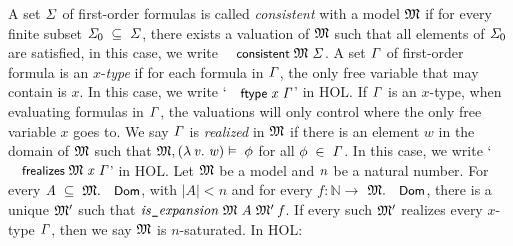 \documentclass{llncs}
\renewcommand{\HOLConst}[1]{{\textsf{\upshape\small #1}}}
\renewcommand{\HOLinline}[1]{\ensuremath{#1}}
\renewcommand{\HOLFieldName}[1]{\HOLConst{#1}}
\begin{document}
A set \HOLinline{\HOLFreeVar{\ensuremath{\Sigma}}} of first-order formulas is called \emph{consistent} with a model \HOLinline{\HOLFreeVar{\ensuremath{\mathfrak{M}}}} if for every finite subset \HOLinline{\HOLFreeVar{\ensuremath{\Sigma}}\sb{\mathrm{0}}\;\HOLSymConst{\HOLTokenSubset{}}\;\HOLFreeVar{\ensuremath{\Sigma}}}, there exists a valuation of \HOLinline{\HOLFreeVar{\ensuremath{\mathfrak{M}}}} such that all elements of \HOLinline{\HOLFreeVar{\ensuremath{\Sigma}}\sb{\mathrm{0}}} are satisfied, in this case, we write \HOLinline{\HOLConst{consistent}\;\HOLFreeVar{\ensuremath{\mathfrak{M}}}\;\HOLFreeVar{\ensuremath{\Sigma}}}. A set \HOLinline{\HOLFreeVar{\ensuremath{\Gamma}}} of first-order formula is an $x$-\emph{type} if for each formula in \HOLinline{\HOLFreeVar{\ensuremath{\Gamma}}}, the only free variable that may contain is $x$. In this case, we write `\HOLinline{\HOLConst{ftype}\;\HOLFreeVar{x}\;\HOLFreeVar{\ensuremath{\Gamma}}}' in HOL. If \HOLinline{\HOLFreeVar{\ensuremath{\Gamma}}} is an $x$-type, when evaluating formulas in \HOLinline{\HOLFreeVar{\ensuremath{\Gamma}}}, the valuations will only control where the only free variable $x$ goes to. We say \HOLinline{\HOLFreeVar{\ensuremath{\Gamma}}} is \emph{realized} in \HOLinline{\HOLFreeVar{\ensuremath{\mathfrak{M}}}} if there is an element $w$ in the domain of \HOLinline{\HOLFreeVar{\ensuremath{\mathfrak{M}}}} such that \HOLinline{\HOLFreeVar{\ensuremath{\mathfrak{M}}},(\HOLTokenLambda{}\HOLBoundVar{v}.\;\HOLFreeVar{w})\ensuremath{\vDash}\;\HOLFreeVar{\ensuremath{\phi}}} for all \HOLinline{\HOLFreeVar{\ensuremath{\phi}}\;\HOLSymConst{\HOLTokenIn{}}\;\HOLFreeVar{\ensuremath{\Gamma}}}. In this case, we write `\HOLinline{\HOLConst{frealizes}\;\HOLFreeVar{\ensuremath{\mathfrak{M}}}\;\HOLFreeVar{x}\;\HOLFreeVar{\ensuremath{\Gamma}}}' in HOL. 
Let \HOLinline{\HOLFreeVar{\ensuremath{\mathfrak{M}}}} be a model and \HOLinline{\HOLFreeVar{n}} be a natural number. 
%
For every \HOLinline{\HOLFreeVar{A}\;\HOLSymConst{\HOLTokenSubset{}}\;\HOLFreeVar{\ensuremath{\mathfrak{M}}}.\HOLFieldName{Dom}}, with $|A|<n$ and for every $f:{\mathbb N}\to $ \HOLinline{\HOLFreeVar{\ensuremath{\mathfrak{M}}}.\HOLFieldName{Dom}}, there is a unique \HOLinline{\HOLFreeVar{\ensuremath{\mathfrak{M}'}}} such that  \HOLinline{\HOLFreeVar{is\HOLTokenUnderscore{}expansion}\;\HOLFreeVar{\ensuremath{\mathfrak{M}}}\;\HOLFreeVar{A}\;\HOLFreeVar{\ensuremath{\mathfrak{M}'}}\;\HOLFreeVar{f}}.
%
If every such \HOLinline{\HOLFreeVar{\ensuremath{\mathfrak{M}'}}} realizes every $x$-type \HOLinline{\HOLFreeVar{\ensuremath{\Gamma}}}, then we say \HOLinline{\HOLFreeVar{\ensuremath{\mathfrak{M}}}} is $n$-saturated. In HOL:
\end{document}
